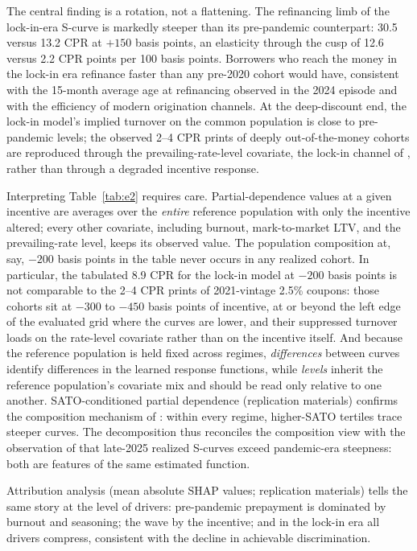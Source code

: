 \documentclass[11pt]{article}
\begin{document}
The central finding is a rotation, not a flattening. The refinancing limb of the lock-in-era
S-curve is markedly steeper than its pre-pandemic counterpart: 30.5 versus 13.2 CPR at $+150$
basis points, an elasticity through the cusp of 12.6 versus 2.2 CPR points per 100 basis points.
Borrowers who reach the money in the lock-in era refinance faster than any pre-2020 cohort
would have, consistent with the 15-month average age at refinancing observed in the 2024
episode and with the efficiency of modern origination channels. At the deep-discount end, the
lock-in model's implied turnover on the common population is close to pre-pandemic levels; the
observed 2--4 CPR prints of deeply out-of-the-money cohorts are reproduced through the
prevailing-rate-level covariate, the lock-in channel of \citet{batzer2024lockin}, rather than
through a degraded incentive response.

Interpreting Table~\ref{tab:e2} requires care. Partial-dependence values at a
given incentive are averages over the \emph{entire} reference population with only the incentive
altered; every other covariate, including burnout, mark-to-market LTV, and the prevailing-rate
level, keeps its observed value. The population composition at, say, $-200$ basis points in the
table never occurs in any realized cohort. In particular, the tabulated 8.9 CPR for the lock-in
model at $-200$ basis points is not comparable to the 2--4 CPR prints of 2021-vintage 2.5\%
coupons: those cohorts sit at $-300$ to $-450$ basis points of incentive, at or beyond the left
edge of the evaluated grid where the curves are lower, and their suppressed turnover loads on
the rate-level covariate rather than on the incentive itself. And because the reference
population is held fixed across regimes, \emph{differences} between curves identify differences
in the learned response functions, while \emph{levels} inherit the reference population's
covariate mix and should be read only relative to one another. SATO-conditioned partial dependence (replication
materials) confirms the composition mechanism of \citet{sancap2024scurves}: within every regime,
higher-SATO tertiles trace steeper curves. The decomposition thus reconciles the composition
view with the observation of \citet{katz2024models} that late-2025 realized S-curves exceed
pandemic-era steepness: both are features of the same estimated function.

Attribution analysis (mean absolute SHAP values; replication materials) tells the same story at
the level of drivers: pre-pandemic prepayment is dominated by burnout and seasoning; the wave by
the incentive; and in the lock-in era all drivers compress, consistent with the decline in
achievable discrimination.
\end{document}
